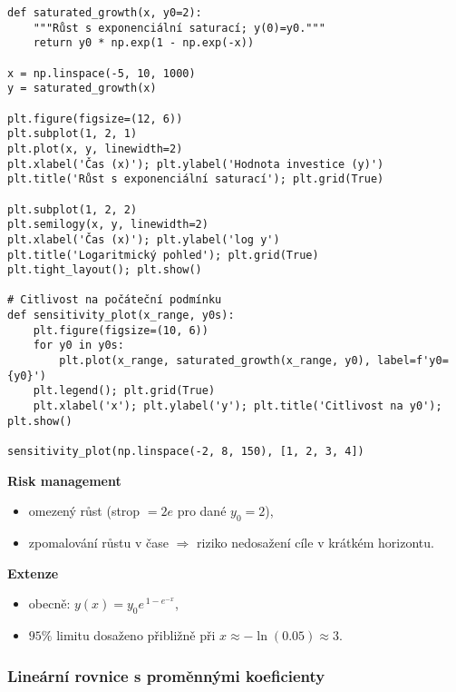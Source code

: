 \begin{example}
\begin{verbatim}
def saturated_growth(x, y0=2):
    """Růst s exponenciální saturací; y(0)=y0."""
    return y0 * np.exp(1 - np.exp(-x))

x = np.linspace(-5, 10, 1000)
y = saturated_growth(x)

plt.figure(figsize=(12, 6))
plt.subplot(1, 2, 1)
plt.plot(x, y, linewidth=2)
plt.xlabel('Čas (x)'); plt.ylabel('Hodnota investice (y)')
plt.title('Růst s exponenciální saturací'); plt.grid(True)

plt.subplot(1, 2, 2)
plt.semilogy(x, y, linewidth=2)
plt.xlabel('Čas (x)'); plt.ylabel('log y')
plt.title('Logaritmický pohled'); plt.grid(True)
plt.tight_layout(); plt.show()

# Citlivost na počáteční podmínku
def sensitivity_plot(x_range, y0s):
    plt.figure(figsize=(10, 6))
    for y0 in y0s:
        plt.plot(x_range, saturated_growth(x_range, y0), label=f'y0={y0}')
    plt.legend(); plt.grid(True)
    plt.xlabel('x'); plt.ylabel('y'); plt.title('Citlivost na y0'); plt.show()

sensitivity_plot(np.linspace(-2, 8, 150), [1, 2, 3, 4])
\end{verbatim}

\textbf{Risk management}
\begin{itemize}
\item omezený růst (strop $=2e$ pro dané $y_0=2$),
\item zpomalování růstu v čase $\Rightarrow$ riziko nedosažení cíle v krátkém horizontu.
\end{itemize}

\textbf{Extenze}
\begin{itemize}
\item obecně: $y(x)=y_0 e^{\,1 - e^{-x}}$,
\item $95\%$ limitu dosaženo přibližně při $x\approx -\ln(0.05)\approx 3$.
\end{itemize}
\end{example}

\subsubsection{Lineární rovnice s proměnnými koeficienty}
\label{subsec:1b-linearne}

